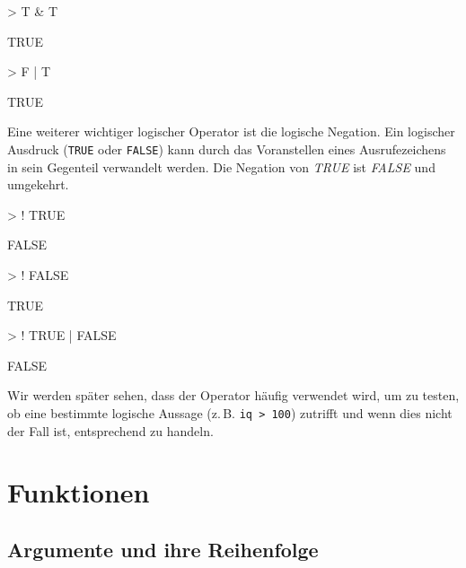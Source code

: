 \begin{Schunk}
\begin{Sinput}
> T & T   
\end{Sinput}
\begin{Soutput}
[1] TRUE
\end{Soutput}
\begin{Sinput}
> F | T
\end{Sinput}
\begin{Soutput}
[1] TRUE
\end{Soutput}
\end{Schunk}

Eine weiterer wichtiger logischer Operator ist die logische Negation. Ein logischer Ausdruck (\texttt{TRUE} oder \texttt{FALSE}) kann durch das Voranstellen eines Ausrufezeichens in sein Gegenteil verwandelt werden. Die Negation von \emph{TRUE} ist \emph{FALSE} und umgekehrt. 

\begin{Schunk}
\begin{Sinput}
> ! TRUE
\end{Sinput}
\begin{Soutput}
[1] FALSE
\end{Soutput}
\begin{Sinput}
> ! FALSE
\end{Sinput}
\begin{Soutput}
[1] TRUE
\end{Soutput}
\begin{Sinput}
> ! TRUE | FALSE
\end{Sinput}
\begin{Soutput}
[1] FALSE
\end{Soutput}
\end{Schunk}

Wir werden später sehen, dass der Operator häufig verwendet wird, um zu testen, ob eine bestimmte logische Aussage (z.\,B. \texttt{iq > 100}) zutrifft und wenn dies nicht der Fall ist, entsprechend zu handeln. 


         

\section{Funktionen}   \label{sec:funktionen}                           

\subsection{Argumente und ihre Reihenfolge}  \label{sec:argumente_reihenfolge}                          


